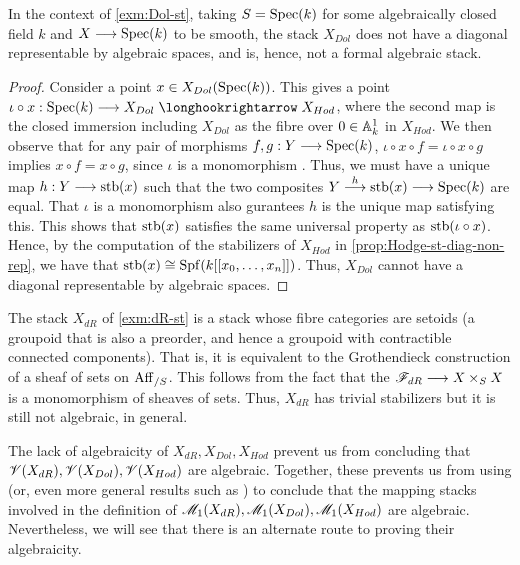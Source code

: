 \documentclass[11pt]{amsart}
\begin{document}
\begin{prop}\label{prop:Dol-st-diag-non-rep}
In the context of \cref{exm:Dol-st}, taking $S = \mathrm{Spec}(k)$ for some
algebraically closed field $k$ and $X \to \Spec(k)$ to be smooth,
the stack $X_{Dol}$ does not have a diagonal representable by algebraic spaces,
and is, hence, not a formal algebraic stack.
\end{prop}
\begin{proof}
Consider a point $x \in X_{Dol}(\mathrm{Spec}(k))$. This gives a point
$\iota \circ x : \Spec(k) \to X_{Dol} \hto X_{Hod}$, where the second map
is the closed immersion including $X_{Dol}$ as the fibre over $0 \in \mathbb{A}^1_k$
in $X_{Hod}$.
We then observe that for any pair of morphisms $f, g : Y \to \Spec(k)$,
$\iota \circ x \circ f = \iota \circ x \circ g$ implies $x \circ f = x \circ g$,
since $\iota$ is a monomorphism
\cite[\href{https://stacks.math.columbia.edu/tag/0504}{Lemma 0504}]
{stacks-project}. Thus, we must have a unique map
$h : Y \to \stb(x)$ such that the two composites
$Y \to[h] \stb(x) \to \Spec(k)$ are equal. That $\iota$ is a monomorphism
also gurantees $h$ is the unique map satisfying this. This shows that
$\mathrm{stb}(x)$ satisfies the same universal property as $\mathrm{stb}(\iota \circ x)$.
Hence, by the computation of the stabilizers of $X_{Hod}$ in
\cref{prop:Hodge-st-diag-non-rep},
we have that $\mathrm{stb}(x) \cong \mathrm{Spf}(k[[x_0, \dots, x_n]])$. Thus,
$X_{Dol}$ cannot have a diagonal representable by algebraic spaces.
\end{proof}

\begin{rmk}\label{rmk:dR-st-set-fibres}
The stack $X_{dR}$ of \cref{exm:dR-st} is a stack whose fibre categories are
setoids (a groupoid that is also a preorder, and hence a groupoid with
contractible connected components). That is, it is equivalent to the
Grothendieck construction of a sheaf of sets on $\mathrm{Aff}_{/S}$.
This follows from the fact that the $\sF_{dR} \to X \times_S X$ is
a monomorphism of sheaves of sets. Thus, $X_{dR}$ has trivial stabilizers but
it is still not algebraic, in general.
\end{rmk}

\begin{rmk}
The lack of algebraicity of $X_{dR}, X_{Dol}, X_{Hod}$ prevent us from
concluding that $\mathscr{V}(X_{dR}), \mathscr{V}(X_{Dol}), \mathscr{V}(X_{Hod})$ are algebraic.
Together, these prevents us from using \cite[Theorem 1.2]{HR19} (or, even more
general results such as \cite[Theorem 5.1.1]{HP23}) to conclude that
the mapping stacks involved in the definition of
$\mathscr{M}_1(X_{dR}), \mathscr{M}_1(X_{Dol}), \mathscr{M}_1(X_{Hod})$ are algebraic.
Nevertheless, we will see that there is an alternate
route to proving their algebraicity.
\end{rmk}
\end{document}
